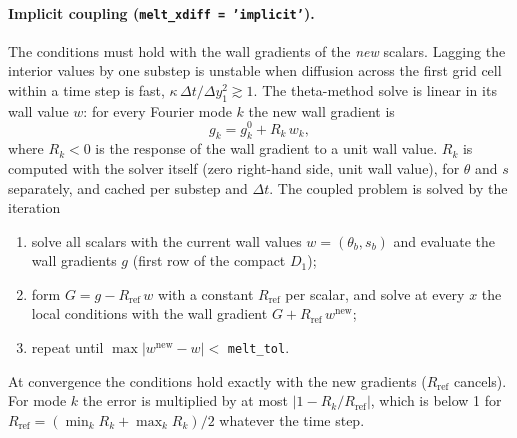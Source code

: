 \documentclass[11pt,a4paper]{article}
\begin{document}
\paragraph{Implicit coupling (\texttt{melt\_xdiff = 'implicit'}).} The conditions must hold with the wall gradients of the \emph{new}
scalars. Lagging the interior values by one substep is unstable when diffusion across the first grid
cell within a time step is fast, $\kappa\,\Delta t/\Delta y_1^2 \gtrsim 1$. The theta-method solve is
linear in its wall value $w$: for every Fourier mode $k$ the new wall gradient is
\begin{equation}
  g_k = g^0_k + R_k\, w_k ,
\end{equation}
where $R_k<0$ is the response of the wall gradient to a unit wall value. $R_k$ is computed with the
solver itself (zero right-hand side, unit wall value), for $\theta$ and $s$ separately, and cached per
substep and $\Delta t$. The coupled problem is solved by the iteration
\begin{enumerate}
  \item solve all scalars with the current wall values $w=(\theta_b,s_b)$ and evaluate the wall
        gradients $g$ (first row of the compact $D_1$);
  \item form $G = g - R_{\mathrm{ref}}\, w$ with a constant $R_{\mathrm{ref}}$ per scalar, and solve at
        every $x$ the local conditions with the wall gradient $G + R_{\mathrm{ref}}\, w^{\mathrm{new}}$;
  \item repeat until $\max|w^{\mathrm{new}}-w| < $ \texttt{melt\_tol}.
\end{enumerate}
At convergence the conditions hold exactly with the new gradients ($R_{\mathrm{ref}}$ cancels). For mode
$k$ the error is multiplied by at most $|1-R_k/R_{\mathrm{ref}}|$, which is below 1 for
$R_{\mathrm{ref}} = (\min_k R_k + \max_k R_k)/2$ whatever the time step.
\end{document}
